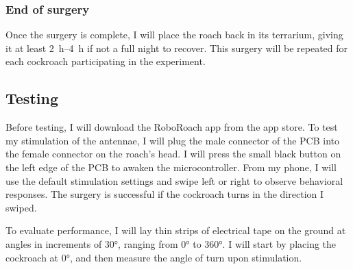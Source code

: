 \subsubsection{End of surgery}
Once the surgery is complete, I will place the roach back in its terrarium, giving it at least \SIrange{2}{4}{\hour} if not a full night to recover. This surgery will be repeated for each cockroach participating in the experiment.



\subsection{Testing}
Before testing, I will download the RoboRoach app from the app store. To test my stimulation of the antennae, I will plug the male connector of the PCB into the female connector on the roach's head. I will press the small black button on the
left edge of the PCB to awaken the microcontroller. From my phone, I will use the default stimulation settings and swipe left or right to observe behavioral responses. The surgery is successful if the cockroach turns in the direction I swiped.

To evaluate performance, I will lay thin strips of electrical tape on the ground at angles in increments of \ang{30}, ranging from \ang{0} to \ang{360}. I will start by placing the cockroach at \ang{0}, and then measure the angle of turn upon stimulation. 






















